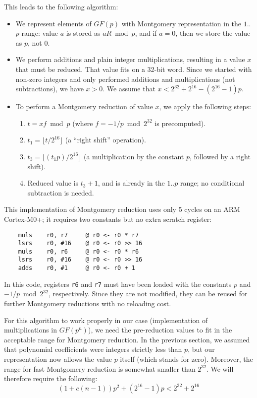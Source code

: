 \documentclass{llncs}
\newcommand{\GF}{GF}
\begin{document}
This leads to the following algorithm:
\begin{itemize}

    \item We represent elements of $\GF(p)$ with Montgomery representation
    in the $1$..$p$ range: value $a$ is stored as $aR \bmod p$, and if
    $a = 0$, then we store the value as $p$, not $0$.

    \item We perform additions and plain integer multiplications,
    resulting in a value $x$ that must be reduced. That value fits on a
    32-bit word. Since we started with non-zero integers and only
    performed additions and multiplications (not subtractions), we have
    $x > 0$. We assume that $x < 2^{32}+2^{16}-(2^{16}-1)p$.

    \item To perform a Montgomery reduction of value $x$, we apply
    the following steps:
    \begin{enumerate}
        \item $t = xf \bmod p$ (where $f = -1/p \bmod 2^{32}$ is
        precomputed).
        \item $t_1 = \lfloor t/2^{16} \rfloor$ (a ``right shift'' operation).
        \item $t_3 = \lfloor (t_1p)/2^{16} \rfloor$ (a multiplication by
        the constant $p$, followed by a right shift).
        \item Reduced value is $t_3+1$, and is already in the $1$..$p$
        range; no conditional subtraction is needed.
    \end{enumerate}

\end{itemize}

This implementation of Montgomery reduction uses only 5 cycles on an ARM
Cortex-M0+; it requires two constants but no extra scratch register:
\begin{verbatim}
    muls    r0, r7     @ r0 <- r0 * r7
    lsrs    r0, #16    @ r0 <- r0 >> 16
    muls    r0, r6     @ r0 <- r0 * r6
    lsrs    r0, #16    @ r0 <- r0 >> 16
    adds    r0, #1     @ r0 <- r0 + 1
\end{verbatim}
In this code, registers \verb+r6+ and \verb+r7+ must have been loaded with
the constants $p$ and $-1/p \bmod 2^{32}$, respectively. Since they
are not modified, they can be reused for further Montgomery reductions
with no reloading cost.

For this algorithm to work properly in our case (implementation of
multiplications in $\GF(p^n)$), we need the pre-reduction values to fit in
the acceptable range for Montgomery reduction. In the previous section,
we assumed that polynomial coefficients were integers strictly less than
$p$, but our representation now allows the value $p$ itself (which stands
for zero). Moreover, the range for fast Montgomery reduction is somewhat
smaller than $2^{32}$. We will therefore require the following:
\begin{equation*}
    (1 + c(n-1)) p^2 + (2^{16}-1)p < 2^{32}+2^{16}
\end{equation*}
\end{document}
